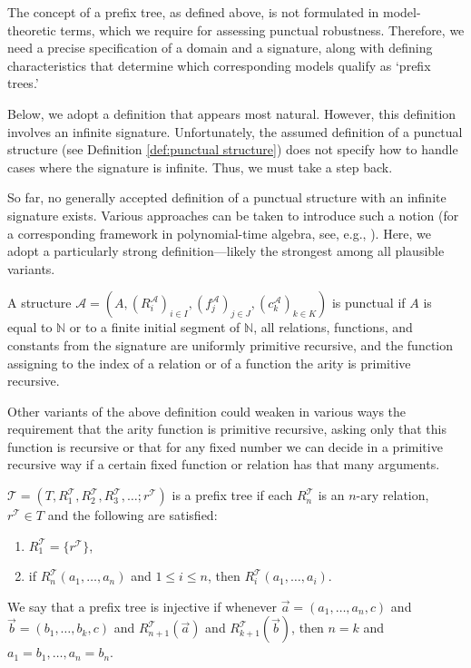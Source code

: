 \documentclass[a4paper,UKenglish,cleveref, autoref, thm-restate]{lipics-v2021}
\begin{document}
The concept of a prefix tree, as defined above, is not formulated in model-theoretic terms, which we require for assessing punctual robustness. Therefore, we need a precise specification of a domain and a signature, along with defining characteristics that determine which corresponding models qualify as `prefix trees.'

Below, we adopt a definition that appears most natural. However, this definition involves an infinite signature. Unfortunately, the assumed definition of a punctual structure (see Definition \ref{def:punctual structure}) does not specify how to handle cases where the signature is infinite. Thus, we must take a step back.

So far, no generally accepted definition of a punctual structure with an infinite signature exists. Various approaches can be taken to introduce such a notion (for a corresponding framework in polynomial-time algebra, see, e.g., \cite{cenzer_feasibly}). Here, we adopt a particularly strong definition---likely the strongest among all plausible variants.

\begin{definition}
    A structure $\mathcal{A}=(A, (R_i^{\mathcal{A}})_{i \in I},(f_j^{\mathcal{A}})_{j \in J},(c_k^{\mathcal{A}})_{k \in K})$ is punctual if $A$ is equal to $\mathbb N$ or to a finite initial segment of $\mathbb N$, all relations, functions, and constants from the signature are uniformly primitive recursive, and the function assigning to the index of a relation or of a function the arity is primitive recursive.
\end{definition}

Other variants of the above definition could weaken in various ways the requirement that the arity function is primitive recursive, asking only that this function is recursive or that for any fixed number we can decide in a primitive recursive way if a certain fixed function or relation has that many arguments.

\begin{definition}
    $\mathcal{T}=(T,R_1^{\mathcal{T}},R_2^{\mathcal{T}},R_3^{\mathcal{T}},\dots;r^{\mathcal{T}})$ is a prefix tree if each $R_n^{\mathcal{T}}$ is an $n$-ary relation, $r^{\mathcal{T}} \in T$ and the following are satisfied:
    \begin{enumerate}
        \item $R_1^{\mathcal{T}}=\{r^{\mathcal{T}}\}$,
        \item if $R_n^{\mathcal{T}}(a_1,\dots,a_n)$ and $1 \leq i \leq n$, then $R_i^{\mathcal{T}}(a_1,\dots,a_i)$.
    \end{enumerate}
    We say that a prefix tree is injective if whenever $\vec{a}=(a_1,\dots,a_n,c)$ and $\vec{b}=(b_1,\dots,b_k,c)$ and $R_{n+1}^{\mathcal{T}}(\vec{a})$ and $R_{k+1}^{\mathcal{T}}(\vec{b})$, then $n=k$ and $a_1=b_1, \dots, a_n=b_n$.
\end{definition}
\end{document}
